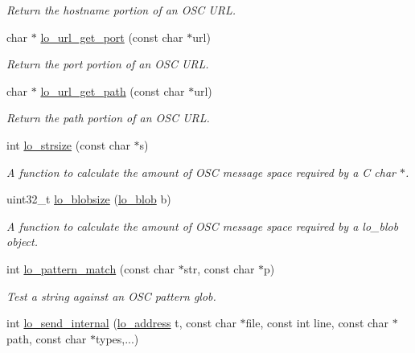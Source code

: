 \begin{CompactItemize}
\begin{CompactList}\small\item\em Return the hostname portion of an OSC URL. \item\end{CompactList}\item 
char $\ast$ \hyperlink{group__liblolowlevel_g488fb8e96fb86320590c1a8ca389593d}{lo\_\-url\_\-get\_\-port} (const char $\ast$url)
\begin{CompactList}\small\item\em Return the port portion of an OSC URL. \item\end{CompactList}\item 
char $\ast$ \hyperlink{group__liblolowlevel_g617d046cc702a2c5ab8539659381ef18}{lo\_\-url\_\-get\_\-path} (const char $\ast$url)
\begin{CompactList}\small\item\em Return the path portion of an OSC URL. \item\end{CompactList}\item 
int \hyperlink{group__liblolowlevel_ge62aa870bad161e4507f6338820ac243}{lo\_\-strsize} (const char $\ast$s)
\begin{CompactList}\small\item\em A function to calculate the amount of OSC message space required by a C char $\ast$. \item\end{CompactList}\item 
uint32\_\-t \hyperlink{group__liblolowlevel_g2315f71c3832c365bce25d9b21726043}{lo\_\-blobsize} (\hyperlink{lo__types_8h_8e780f8c09e3e4dd737fe249f11d16fc}{lo\_\-blob} b)
\begin{CompactList}\small\item\em A function to calculate the amount of OSC message space required by a lo\_\-blob object. \item\end{CompactList}\item 
int \hyperlink{group__liblolowlevel_gc26f3d15dbd23f34d4f9e4f6f0b81bbb}{lo\_\-pattern\_\-match} (const char $\ast$str, const char $\ast$p)
\begin{CompactList}\small\item\em Test a string against an OSC pattern glob. \item\end{CompactList}\item 
int \hyperlink{group__liblolowlevel_ga7dc23a688fb08e2af1f5b981d7b0798}{lo\_\-send\_\-internal} (\hyperlink{lo__types_8h_bf9b53223467de596b89e1377b0f3f3d}{lo\_\-address} t, const char $\ast$file, const int line, const char $\ast$path, const char $\ast$types,...)

\end{CompactItemize}
